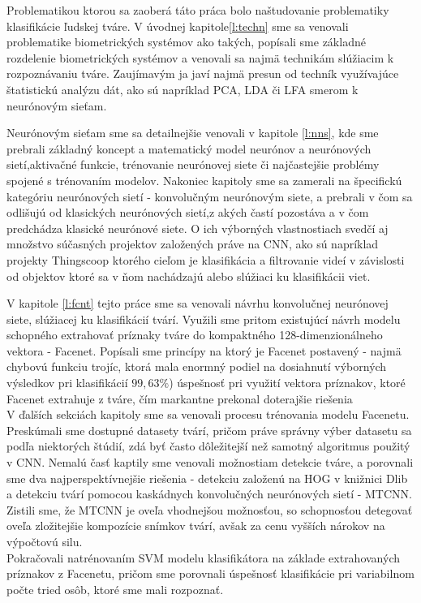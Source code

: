 \noindent Problematikou ktorou sa zaoberá táto práca bolo naštudovanie problematiky klasifikácie ľudskej tváre. 
V úvodnej kapitole\ref{l:techn} sme sa venovali problematike biometrických systémov ako takých, popísali sme základné rozdelenie biometrických systémov a venovali sa najmä technikám slúžiacim k rozpoznávaniu tváre.
Zaujímavým ja javí najmä presun od techník využívajúce štatistickú analýzu dát, ako sú napríklad PCA, LDA či LFA smerom k neurónovým sieťam.

\noindent Neurónovým sieťam sme sa detailnejšie venovali v kapitole \ref{l:nns}, kde sme prebrali základný koncept a matematický model neurónov a neurónových sietí,aktivačné funkcie, trénovanie neurónovej siete či najčastejšie problémy spojené s trénovaním modelov.
Nakoniec kapitoly sme sa zamerali na špecifickú kategóriu neurónových sietí - konvolučným neurónovým siete, a prebrali v čom sa odlišujú od klasických neurónových sietí,z akých častí pozostáva a v čom predchádza klasické neurónové siete.
O ich výborných vlastnostiach svedčí aj množstvo súčasných projektov založených práve na CNN, ako sú napríklad projekty Thingscoop\cite{agermani43} ktorého cieľom je klasifikácia a filtrovanie videí v závislosti od objektov ktoré sa v ňom nachádzajú alebo \cite{Kim14f} slúžiaci ku klasifikácii viet.

\noindent V kapitole \ref{l:fcnt} tejto práce sme sa venovali návrhu konvolučnej neurónovej siete, slúžiacej ku klasifikácií tvárí.
Využili sme pritom existujúcí návrh modelu schopného extrahovať príznaky tváre do kompaktného 128-dimenzionálneho vektora - Facenet\cite{schroff2015facenet}.
Popísali sme princípy na ktorý je Facenet postavený - najmä chybovú funkciu trojíc, ktorá mala enormný podiel na dosiahnutí výborných výsledkov pri klasifikácií $ 99,63\% $) úspešnosť pri využití vektora príznakov, ktoré Facenet extrahuje z tváre, čím markantne prekonal doterajšie riešenia\\
\noindent V ďalších sekciách kapitoly sme sa venovali procesu trénovania modelu Facenetu.
Preskúmali sme dostupné datasety tvárí, pričom práve správny výber datasetu sa podľa niektorých štúdií\cite{Centerfo}, zdá byť často dôležitejší než samotný algoritmus použitý v CNN.
Nemalú časť kaptily sme venovali možnostiam detekcie tváre, a porovnali sme dva najperspektívnejšie  riešenia - detekciu založenú na HOG v knižnici Dlib a detekciu tvárí pomocou kaskádnych konvolučných neurónových sietí - MTCNN.
Zistili sme, že MTCNN\cite{mtcnn} je oveľa vhodnejšou možnosťou, so schopnosťou detegovať oveľa zložitejšie kompozície snímkov tvárí, avšak za cenu vyšších nárokov na výpočtovú silu. \\
\noindent Pokračovali natrénovaním SVM modelu klasifikátora na základe extrahovaných príznakov z Facenetu, pričom sme porovnali úspešnosť klasifikácie pri variabilnom počte tried osôb, ktoré sme mali rozpoznať.

